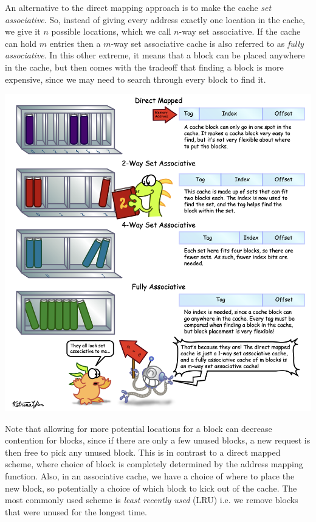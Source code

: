 \documentclass[10pt,a4paper]{article}
\begin{document}
An alternative to the direct mapping approach is to make the cache \textit{set associative}. So, instead of giving every address exactly one location in the cache, we give it $n$ possible locations, which we call $n$-way set associative. If the cache can hold $m$ entries then a $m$-way set associative cache is also referred to as \textit{fully associative}. In this other extreme, it means that a block can be placed anywhere in the cache, but then comes with the tradeoff that finding a block is more expensive, since we may need to search through every block to find it.
\begin{center}
    \includegraphics[scale=0.35]{images/cache_assoc.png}
\end{center}
Note that allowing for more potential locations for a block can decrease contention for blocks, since if there are only a few unused blocks, a new request is then free to pick any unused block. This is in contrast to a direct mapped scheme, where choice of block is completely determined by the address mapping function. Also, in an associative cache, we have a choice of where to place the new block, so potentially a choice of which block to kick out of the cache. The most commonly used scheme is \textit{least recently used} (LRU) i.e. we remove blocks that were unused for the longest time.
\end{document}
